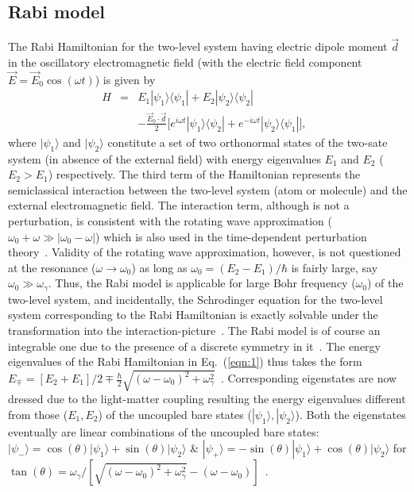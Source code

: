 \documentclass[aps,pra,twocolumn,showpacs,preprintnumbers,amsmath,amssymb,footinbib]{revtex4}
\begin{document}
\subsection{Rabi model}
The Rabi Hamiltonian for the two-level system having electric dipole moment $\vec{d}$ in the oscillatory electromagnetic field (with the electric field component $\vec{E}=\vec{E}_0\cos(\omega t)$) is given by~\cite{Rabi,Rabi2,Sakurai,Cohen-Tannudji}
\begin{eqnarray}\label{eqn:1}
H&=&E_1|\psi_1\rangle\langle\psi_1|+E_2|\psi_2\rangle\langle\psi_2|\nonumber\\&&-\frac{\vec{E}_0\cdot\vec{d}}{2}\big[e^{i\omega t}|\psi_1\rangle\langle\psi_2|+e^{-i\omega t}|\psi_2\rangle\langle\psi_1|\big],~~~
\end{eqnarray}
where $|\psi_1\rangle$ and $|\psi_2\rangle$ constitute a set of two orthonormal states of the two-sate system (in absence of the external field) with energy eigenvalues $E_1$ and $E_2$ ($E_2>E_1$) respectively. The third term of the Hamiltonian represents the semiclassical interaction between the two-level system (atom or molecule) and the external electromagnetic field. The interaction term, although is not a perturbation, is consistent with the rotating wave approximation ($\omega_0+\omega\gg|\omega_0-\omega|$) which is also used in the time-dependent perturbation theory~\cite{Rabi2,Griffiths}. Validity of the rotating wave approximation, however, is not questioned at the resonance ($\omega\rightarrow\omega_0$) as long as $\omega_0=(E_2-E_1)/\hbar$ is fairly large, say $\omega_0\gg\omega_\gamma$. Thus, the Rabi model is applicable for large Bohr frequency ($\omega_0$) of the two-level system, and incidentally, the Schrodinger equation for the two-level system corresponding to the Rabi Hamiltonian is exactly solvable under the transformation into the interaction-picture~\cite{Rabi2,Griffiths}. The Rabi model is of course an integrable one due to the presence of a discrete symmetry in it~\cite{Braak}. The energy eigenvalues of the Rabi Hamiltonian in Eq.~(\ref{eqn:1}) thus takes the form $E_\mp=[E_2+E_1]/2\mp\frac{\hbar}{2}\sqrt{(\omega-\omega_0)^2+\omega_\gamma^2}$~\cite{Rabi2}. Corresponding eigenstates are now dressed due to the light-matter coupling resulting the energy eigenvalues different from those ($E_1, E_2$) of the uncoupled bare states ($|\psi_1\rangle, |\psi_2\rangle$). Both the eigenstates eventually are linear combinations of the uncoupled bare states: $|\psi_-\rangle=\cos(\theta)|\psi_1\rangle+\sin(\theta)|\psi_2\rangle$ \& $|\psi_+\rangle=-\sin(\theta)|\psi_1\rangle+\cos(\theta)|\psi_2\rangle$ for $\tan(\theta)=\omega_\gamma/[\sqrt{(\omega-\omega_0)^2+\omega_\gamma^2}-(\omega-\omega_0)]$~\cite{Benson}.
\end{document}
